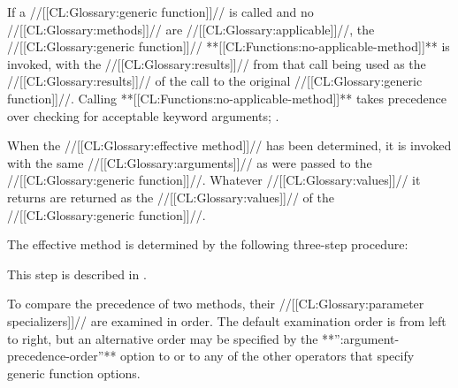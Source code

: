 
If a //[[CL:Glossary:generic function]]// is called and no //[[CL:Glossary:methods]]// are  //[[CL:Glossary:applicable]]//, the //[[CL:Glossary:generic function]]// **[[CL:Functions:no-applicable-method]]** is invoked, with the //[[CL:Glossary:results]]// from that call being used as the //[[CL:Glossary:results]]// of the call to the original //[[CL:Glossary:generic function]]//.  Calling **[[CL:Functions:no-applicable-method]]** takes precedence over checking for acceptable keyword arguments; \seesection\KwdArgsInGFsAndMeths.

When the //[[CL:Glossary:effective method]]// has been determined, it is invoked with the same //[[CL:Glossary:arguments]]// as were passed to the //[[CL:Glossary:generic function]]//.   Whatever //[[CL:Glossary:values]]// it returns are returned as the //[[CL:Glossary:values]]// of the //[[CL:Glossary:generic function]]//.

 

The effective method is determined by the following three-step procedure:

\beginlist




\endlist

 

This step is described in \secref\IntroToMethods.

\endsubsubsubsection%


To compare the precedence of two methods, their //[[CL:Glossary:parameter specializers]]// are examined in order.  The default examination order is from left to right, but an alternative order may be specified by the  **'':argument-precedence-order''** option to  or to any of the other operators that specify generic function options.

